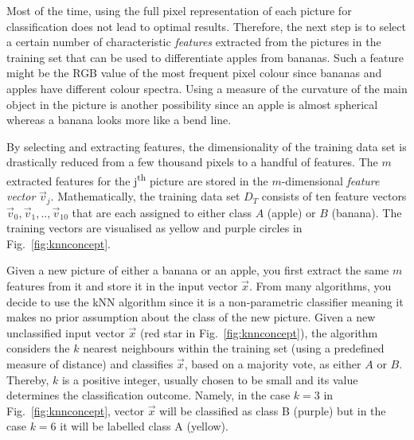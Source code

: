 
Most of the time, using the full pixel representation of each picture for classification does not lead to optimal results. Therefore, the next step is to select a certain number of characteristic \emph{features} extracted from the pictures in the training set that can be used to differentiate apples from bananas. Such a feature might be the RGB value of the most frequent pixel colour since bananas and apples have different colour spectra. Using a measure of the curvature of the main object in the picture is another possibility since an apple is almost spherical whereas a banana looks more like a bend line.

By selecting and extracting features, the dimensionality of the training data set is drastically reduced from a few thousand pixels to a handful of features. The $m$ extracted features for the j\textsuperscript{th} picture are stored in the $m$-dimensional \emph{feature vector} $\vec{v}_{j}$. Mathematically, the training data set ${D}_{T}$ consists of ten feature vectors $\vec{v}_{0}, \vec{v}_{1},..,\vec{v}_{10}$ that are each assigned to either class $A$ (apple) or $B$ (banana). The training vectors are visualised as yellow and purple circles in Fig.~\ref{fig:knnconcept}.

Given a new picture of either a banana or an apple, you first extract the same $m$ features from it and store it in the input vector $\vec{x}$. From many algorithms, you decide to use the kNN algorithm since it is a non-parametric classifier meaning it makes no prior assumption about the class of the new picture. Given a new unclassified input vector $\vec{x}$ (red star in Fig.~\ref{fig:knnconcept}), the algorithm considers the $k$ nearest neighbours within the training set (using a predefined measure of distance) and classifies $\vec{x}$, based on a majority vote, as either $A$ or $B$. Thereby, $k$ is a positive integer, usually chosen to be small and its value determines the classification outcome. Namely, in the case $k = 3$ in Fig.~\ref{fig:knnconcept}, vector $\vec{x}$ will be classified as class B (purple) but in the case $k = 6$ it will be labelled class A (yellow).

